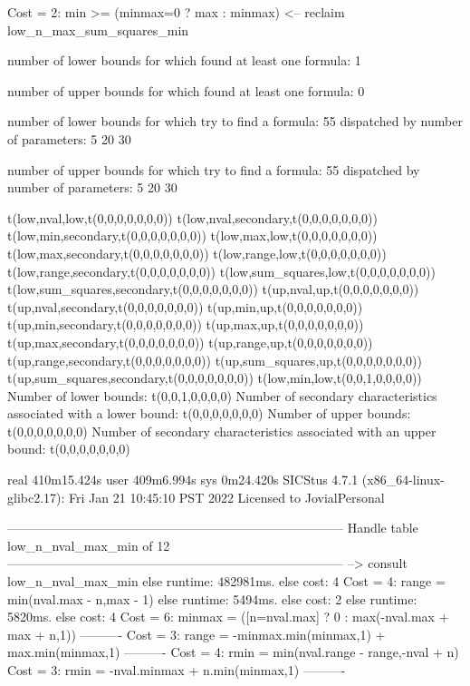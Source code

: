 Cost =  2:  min >= (minmax=0 ? max : minmax)
<-- reclaim low_n_max_sum_squares_min

number of lower bounds for which found at least one formula: 1

number of upper bounds for which found at least one formula: 0

number of lower bounds for which try to find a formula: 55
dispatched by number of parameters: 5  20  30

number of upper bounds for which try to find a formula: 55
dispatched by number of parameters: 5  20  30

t(low,nval,low,t(0,0,0,0,0,0,0))
t(low,nval,secondary,t(0,0,0,0,0,0,0))
t(low,min,secondary,t(0,0,0,0,0,0,0))
t(low,max,low,t(0,0,0,0,0,0,0))
t(low,max,secondary,t(0,0,0,0,0,0,0))
t(low,range,low,t(0,0,0,0,0,0,0))
t(low,range,secondary,t(0,0,0,0,0,0,0))
t(low,sum_squares,low,t(0,0,0,0,0,0,0))
t(low,sum_squares,secondary,t(0,0,0,0,0,0,0))
t(up,nval,up,t(0,0,0,0,0,0,0))
t(up,nval,secondary,t(0,0,0,0,0,0,0))
t(up,min,up,t(0,0,0,0,0,0,0))
t(up,min,secondary,t(0,0,0,0,0,0,0))
t(up,max,up,t(0,0,0,0,0,0,0))
t(up,max,secondary,t(0,0,0,0,0,0,0))
t(up,range,up,t(0,0,0,0,0,0,0))
t(up,range,secondary,t(0,0,0,0,0,0,0))
t(up,sum_squares,up,t(0,0,0,0,0,0,0))
t(up,sum_squares,secondary,t(0,0,0,0,0,0,0))
t(low,min,low,t(0,0,1,0,0,0,0))
Number of lower bounds:                                             t(0,0,1,0,0,0,0)
Number of secondary characteristics associated with a lower bound:  t(0,0,0,0,0,0,0)
Number of upper bounds:                                             t(0,0,0,0,0,0,0)
Number of secondary characteristics associated with an upper bound: t(0,0,0,0,0,0,0)

real	410m15.424s
user	409m6.994s
sys	0m24.420s
SICStus 4.7.1 (x86_64-linux-glibc2.17): Fri Jan 21 10:45:10 PST 2022
Licensed to JovialPersonal


--------------------------------------------------------------------------------
Handle table low_n_nval_max_min of 12
--------------------------------------------------------------------------------
--> consult low_n_nval_max_min
else runtime: 482981ms. else cost: 4
Cost =  4:  range  = min(nval.max - n,max - 1) %
else runtime: 5494ms. else cost: 2
else runtime: 5820ms. else cost: 4
Cost =  6:  minmax = ([n=nval.max] ? 0 : max(-nval.max + max + n,1)) %
----------
Cost =  3:  range  = -minmax.min(minmax,1) + max.min(minmax,1)
----------
Cost =  4:  rmin   = min(nval.range - range,-nval + n)
Cost =  3:  rmin   = -nval.minmax + n.min(minmax,1)
----------

